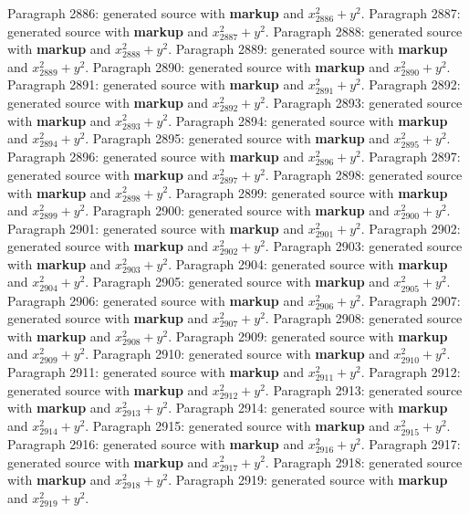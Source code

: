\documentclass{article}
\begin{document}
Paragraph 2886: generated source with \textbf{markup} and $x_{2886}^2 + y^2$.
Paragraph 2887: generated source with \textbf{markup} and $x_{2887}^2 + y^2$.
Paragraph 2888: generated source with \textbf{markup} and $x_{2888}^2 + y^2$.
Paragraph 2889: generated source with \textbf{markup} and $x_{2889}^2 + y^2$.
Paragraph 2890: generated source with \textbf{markup} and $x_{2890}^2 + y^2$.
Paragraph 2891: generated source with \textbf{markup} and $x_{2891}^2 + y^2$.
Paragraph 2892: generated source with \textbf{markup} and $x_{2892}^2 + y^2$.
Paragraph 2893: generated source with \textbf{markup} and $x_{2893}^2 + y^2$.
Paragraph 2894: generated source with \textbf{markup} and $x_{2894}^2 + y^2$.
Paragraph 2895: generated source with \textbf{markup} and $x_{2895}^2 + y^2$.
Paragraph 2896: generated source with \textbf{markup} and $x_{2896}^2 + y^2$.
Paragraph 2897: generated source with \textbf{markup} and $x_{2897}^2 + y^2$.
Paragraph 2898: generated source with \textbf{markup} and $x_{2898}^2 + y^2$.
Paragraph 2899: generated source with \textbf{markup} and $x_{2899}^2 + y^2$.
Paragraph 2900: generated source with \textbf{markup} and $x_{2900}^2 + y^2$.
Paragraph 2901: generated source with \textbf{markup} and $x_{2901}^2 + y^2$.
Paragraph 2902: generated source with \textbf{markup} and $x_{2902}^2 + y^2$.
Paragraph 2903: generated source with \textbf{markup} and $x_{2903}^2 + y^2$.
Paragraph 2904: generated source with \textbf{markup} and $x_{2904}^2 + y^2$.
Paragraph 2905: generated source with \textbf{markup} and $x_{2905}^2 + y^2$.
Paragraph 2906: generated source with \textbf{markup} and $x_{2906}^2 + y^2$.
Paragraph 2907: generated source with \textbf{markup} and $x_{2907}^2 + y^2$.
Paragraph 2908: generated source with \textbf{markup} and $x_{2908}^2 + y^2$.
Paragraph 2909: generated source with \textbf{markup} and $x_{2909}^2 + y^2$.
Paragraph 2910: generated source with \textbf{markup} and $x_{2910}^2 + y^2$.
Paragraph 2911: generated source with \textbf{markup} and $x_{2911}^2 + y^2$.
Paragraph 2912: generated source with \textbf{markup} and $x_{2912}^2 + y^2$.
Paragraph 2913: generated source with \textbf{markup} and $x_{2913}^2 + y^2$.
Paragraph 2914: generated source with \textbf{markup} and $x_{2914}^2 + y^2$.
Paragraph 2915: generated source with \textbf{markup} and $x_{2915}^2 + y^2$.
Paragraph 2916: generated source with \textbf{markup} and $x_{2916}^2 + y^2$.
Paragraph 2917: generated source with \textbf{markup} and $x_{2917}^2 + y^2$.
Paragraph 2918: generated source with \textbf{markup} and $x_{2918}^2 + y^2$.
Paragraph 2919: generated source with \textbf{markup} and $x_{2919}^2 + y^2$.
\end{document}
